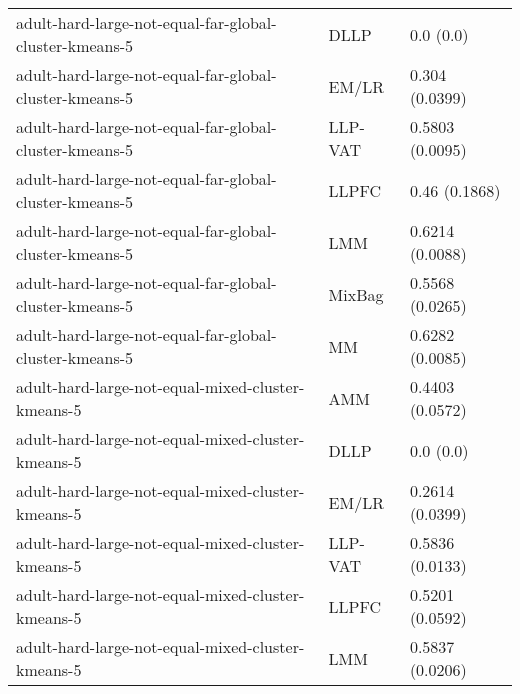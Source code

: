 \begin{longtable}{lll}
                                                       adult-hard-large-not-equal-far-global-cluster-kmeans-5 &      DLLP &                             0.0 (0.0) \\
                                                       adult-hard-large-not-equal-far-global-cluster-kmeans-5 &     EM/LR &                        0.304 (0.0399) \\
                                                       adult-hard-large-not-equal-far-global-cluster-kmeans-5 &   LLP-VAT &                       0.5803 (0.0095) \\
                                                       adult-hard-large-not-equal-far-global-cluster-kmeans-5 &     LLPFC &                         0.46 (0.1868) \\
                                                       adult-hard-large-not-equal-far-global-cluster-kmeans-5 &       LMM &                       0.6214 (0.0088) \\
                                                       adult-hard-large-not-equal-far-global-cluster-kmeans-5 &    MixBag &                       0.5568 (0.0265) \\
                                                       adult-hard-large-not-equal-far-global-cluster-kmeans-5 &        MM &                       0.6282 (0.0085) \\
                                                            adult-hard-large-not-equal-mixed-cluster-kmeans-5 &       AMM &                       0.4403 (0.0572) \\
                                                            adult-hard-large-not-equal-mixed-cluster-kmeans-5 &      DLLP &                             0.0 (0.0) \\
                                                            adult-hard-large-not-equal-mixed-cluster-kmeans-5 &     EM/LR &                       0.2614 (0.0399) \\
                                                            adult-hard-large-not-equal-mixed-cluster-kmeans-5 &   LLP-VAT &                       0.5836 (0.0133) \\
                                                            adult-hard-large-not-equal-mixed-cluster-kmeans-5 &     LLPFC &                       0.5201 (0.0592) \\
                                                            adult-hard-large-not-equal-mixed-cluster-kmeans-5 &       LMM &                       0.5837 (0.0206) \\

\end{longtable}
